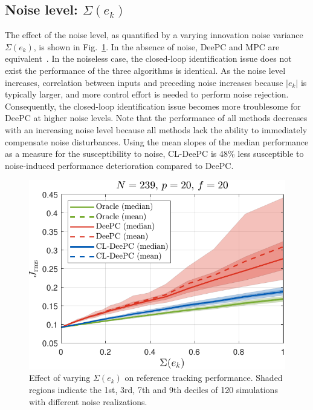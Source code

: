 \subsection{Noise level: $\Sigma(e_k)$}
\noindent The effect of the noise level, as quantified by a varying innovation noise variance $\Sigma(e_k)$, is shown in Fig.~\ref{fig:varying_Re}. In the absence of noise, \ac{DeePC} and \ac{MPC} are equivalent~\cite{Coulson2019}. In the noiseless case, the closed-loop identification issue does not exist the performance of the three algorithms is identical. As the noise level increases, correlation between inputs and preceding noise increases because $|e_k|$ is typically larger, and more control effort is needed to perform noise rejection. Consequently, the closed-loop identification issue becomes more troublesome for \ac{DeePC} at higher noise levels. Note that the performance of all methods decreases with an increasing noise level because all methods lack the ability to immediately compensate noise disturbances. Using the mean slopes of the median performance as a measure for the susceptibility to noise, \ac{CL-DeePC} is 48\% less susceptible to noise-induced performance deterioration compared to \ac{DeePC}.%
\begin{figure}[t!]
\begin{center}
\includegraphics[width=\columnwidth]{results/figures/Varying_Re_0.0001-1-50_Nbar_239_p_20_f_20_Ru_1_Rdu_0_Q_100_R_0_dR_10.pdf}    %
\caption{Effect of varying $\Sigma(e_k)$ on reference tracking performance. Shaded regions indicate the 1st, 3rd, 7th and 9th deciles of 120 simulations with different noise realizations.}  %
\label{fig:varying_Re}                                 %
\end{center}                                 %
\end{figure}
